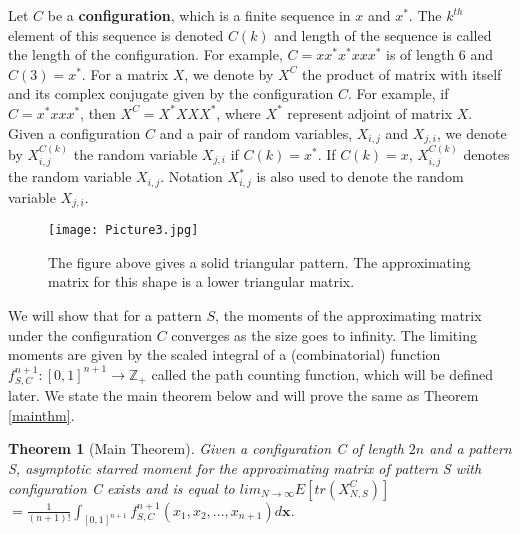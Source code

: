 \documentclass[12pt]{amsart}
\newtheorem{thm}{Theorem}[section]
\theoremstyle{definition}
\theoremstyle{remark}
\begin{document}
Let $C$ be a \textbf{configuration}, which is a finite sequence in $x$ and $x^*$. The $k^{th}$ element of this sequence is denoted $C(k)$ and length of the sequence is called the length of the configuration. For example, $C=xx^*x^*xxx^*$ is of length 6 and $C(3)=x^*$. For a matrix $X$, we denote by $X^C$ the product of matrix with itself and its complex conjugate given by the configuration $C$. For example, if $C=x^*xxx^*$, then $X^C= X^*XXX^*$, where $X^*$ represent adjoint of matrix $X$. Given a configuration $C$ and a pair of random variables, $X_{i,j}$ and $X_{j,i}$, we denote by $X_{i,j}^{C(k)}$ the random variable $X_{j,i}$ if $C(k)=x^*$. If $C(k)=x$, $X_{i,j}^{C(k)}$ denotes the random variable $X_{i,j}$. Notation $X_{i,j}^*$ is also used to denote the random variable $X_{j,i}$. \\

\begin{figure}
    \centering
\texttt{[image: Picture3.jpg]}
    \caption{The figure above gives a solid triangular pattern. The approximating matrix for this shape is a lower triangular matrix. }
    \label{fig2}
\end{figure}

We will show that for a pattern $S$, the moments of the approximating matrix under the configuration $C$ converges as the size goes to infinity. The limiting moments are given by the scaled integral of a (combinatorial) function $f_{S,C}^{n+1}:[0,1]^{n+1} \to \mathbb{Z}_+$ called the path counting function, which will be defined later. We state the main theorem below and will prove the same as Theorem \ref{mainthm}.\\

\begin{thm}[Main Theorem] \label{MT}
    Given a configuration C of length $2n$ and a pattern S, asymptotic starred moment for the approximating matrix of pattern S with configuration C exists and is equal to $ lim_{N \to \infty} E[tr(X_{N,S}^C)]$ $= \frac{1}{(n+1)!}\int_{[0,1]^{n+1}}f_{S,C}^{n+1}(x_1,x_2,...,x_{n+1})d\mathbf{x}$.
\end{thm}
\end{document}
